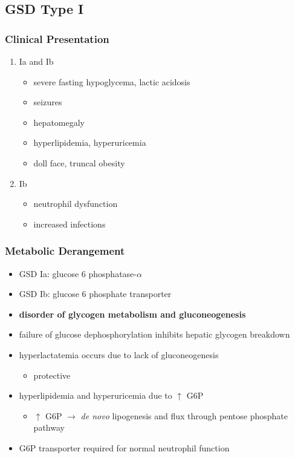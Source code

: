 \documentclass{scrartcl}
\begin{document}
\subsection{GSD Type I}
\label{sec:orgbd2dd78}
\subsubsection{Clinical Presentation}
\label{sec:org45293a7}
\begin{enumerate}
\item Ia and Ib
\label{sec:org722d288}
\begin{itemize}
\item severe fasting hypoglycema, lactic acidosis
\item seizures
\item hepatomegaly
\item hyperlipidemia, hyperuricemia
\item doll face, truncal obesity
\end{itemize}
\item Ib
\label{sec:orgc896556}
\begin{itemize}
\item neutrophil dysfunction
\item increased infections
\end{itemize}
\end{enumerate}
\subsubsection{Metabolic Derangement}
\label{sec:org7e18d7b}
\begin{itemize}
\item GSD Ia: glucose 6 phosphatase-\(\alpha\)
\item GSD Ib: glucose 6 phosphate transporter
\item \textbf{disorder of glycogen metabolism and gluconeogenesis}
\item failure of glucose dephosphorylation inhibits hepatic glycogen breakdown
\item hyperlactatemia occurs due to lack of gluconeogenesis
\begin{itemize}
\item protective
\end{itemize}
\item hyperlipidemia and hyperuricemia due to \(\uparrow\) G6P
\begin{itemize}
\item \(\uparrow\) G6P \(\to\) \emph{de novo} lipogenesis and flux through pentose phosphate pathway
\end{itemize}
\item G6P transporter required for normal neutrophil function
\end{itemize}
\end{document}
